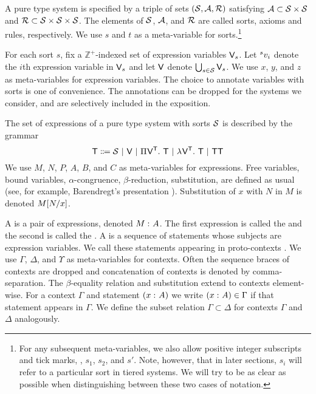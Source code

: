 \documentclass{article}
\begin{document}
A pure type system is specified by a triple of sets $(\sorts, \axioms, \rules)$ satisfying $\axioms \subset \sorts \times \sorts$ and $\rules \subset \sorts \times \sorts \times \sorts$.
The elements of $\sorts$, $\axioms$, and $\rules$ are called sorts, axioms and rules, respectively.
We use $s$ and $t$ as a meta-variable for sorts.\footnote{For any subsequent meta-variables, we also allow positive integer subscripts and tick marks, \eg, $s_1$, $s_2$, and $s'$. Note, however, that in later sections, $s_i$ will refer to a particular sort in tiered systems. We will try to be as clear as possible when distinguishing between these two cases of notation.}

For each sort $s$, fix a $\mathbb Z^+$-indexed set of expression variables $\vars_s$.
Let $\var[s]{v_i}$ denote the $i$th expression variable in $\vars_s$ and let $\vars$ denote $\bigcup_{s \in \sorts} \vars_s$.
We use $x$, $y$, and $z$ as meta-variables for expression variables.
The choice to annotate variables with sorts is one of convenience.
The annotations can be dropped for the systems we consider, and are selectively included in the exposition.

The set of expressions of a pure type system with sorts $\sorts$ is described by the grammar
\[
\terms \bnfeq
    \sorts \sbar
    \vars \sbar
    \PiT \vars \terms \terms \sbar
    \lambdaT \vars \terms \terms \sbar
    \terms \terms
\]
We use $M$, $N$, $P$, $A$, $B$, and $C$ as meta-variables for expressions.
Free variables, bound variables, $\alpha$-congruence, $\beta$-reduction, substitution, \etc are defined as usual (see, for example, Barendregt's presentation \cite{barendregt-1993}).
Substitution of $x$ with $N$ in $M$ is denoted $\sub M N x$.

A  is a pair of expressions, denoted $\statement M A$.
The first expression is called the  and the second is called the .
A  is a sequence of statements whose subjects are expression variables.
We call these statements appearing in proto-contexts .
We use $\Gamma$, $\Delta$, and $\Upsilon$ as meta-variables for contexts.
Often the sequence braces of contexts are dropped and concatenation of contexts is denoted by comma-separation.
The $\beta$-equality relation and substitution extend to contexts element-wise.
For a context $\Gamma$ and statement $(\statement x A)$ we write $(\statement x A) \in \Gamma$ if that statement appears in $\Gamma$.
We define the subset relation $\Gamma \subset \Delta$ for contexts $\Gamma$ and $\Delta$ analogously.
\end{document}
